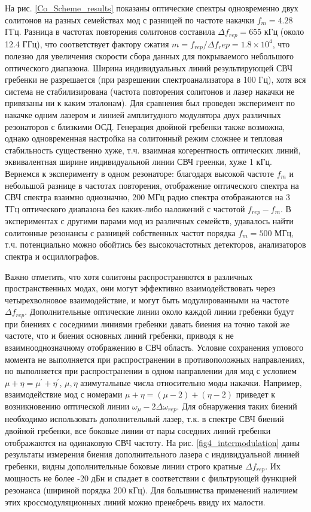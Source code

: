На рис. \ref{Co_Scheme_results} показаны оптические спектры одновременно двух солитонов на разных семействах мод с разницей по частоте накачки $f_m=4.28$ ГГц. Разница в частотах повторения солитонов составила $\Delta f_{rep}=655$ кГц (около 12.4 ГГц), что соответствует фактору сжатия \cite{Coddington2016} $m=f_{rep}/\Delta f_rep=1.8\times10^4$, что полезно для увеличения скорости сбора данных для покрываемого небольшого оптического диапазона. Ширина индивидуальных линий результирующей СВЧ гребенки не разрешается (при разрешении спектроанализатора в 100 Гц), хотя вся система не стабилизирована (частота повторения солитонов и лазер накачки не привязаны ни к каким эталонам). Для сравнения был проведен эксперимент по накачке одним лазером и линией амплитудного модулятора двух различных резонаторов с близкими ОСД. Генерация двойной гребенки также возможна, однако одновременная настройка на солитонный режим сложнее и тепловая стабильность существенно хуже, т.ч. взаимная когерентность оптических линий, эквивалентная ширине индивидуальной линии СВЧ греенки, хуже 1 кГц. Вернемся к эксперименту в одном резонаторе: благодаря высокой частоте $f_m$ и небольшой разнице в частотах повторения, отображение оптического спектра на СВЧ спектра взаимно однозначно, 200 МГц радио спектра отображаются на 3 ТГц оптического диапазона без каких-либо наложений с частотой $f_{rep}-f_m$. В экспериментах с другими парами мод из различных семейств, удавалось найти солитонные резонансы с разницей собственных частот порядка $f_m=500$ МГц, т.ч. потенциально можно обойтись без высокочастотных детекторов, анализаторов спектра и осциллографов.

Важно отметить, что хотя солитоны распространяются в различных пространственных модах, они могут эффективно взаимодействовать через четырехволновое взаимодействие, и могут быть модулированными на частоте $\Delta f_{rep}$. Дополнительные оптические линии около каждой линии гребенки будут при биениях с соседними линиями гребенки давать биения на точно такой же частоте, что и биения основных линий гребенки, приводя к не взаимнооднозначному отображению в СВЧ область. Условие сохранения углового момента не выполняется при распространении в противоположных направлениях, но выполняется при распространении в одном направлении для мод с условием $\mu+\eta=\mu^\prime+\eta^\prime$, $\mu,\eta$ азимутальные числа относительно моды накачки. Например, взаимодействие мод с номерами $\mu+\eta=(\mu-2)+(\eta-2)$ приведет к возникновению оптической линии $\omega_{\mu}-2\Delta\omega_{rep}$. Для обнаружения таких биений необходимо использовать дополнительный лазер, т.к. в спектре СВЧ биений двойной гребенки, все боковые линии от пары соседних линий гребенки отображаются на одинаковую СВЧ частоту. На рис. \ref{fig4_intermodulation} даны результаты измерения биения дополнительного лазера с индивидуальной линией гребенки, видны дополнительные боковые линии строго кратные $\Delta f_{rep}$. Их мощность не более -20 дБн и спадает в соответствии с фильтрующей функцией резонанса (шириной порядка 200 кГц). Для большинства применений наличием этих кроссмодуляционных линий можно пренебречь ввиду их малости.

